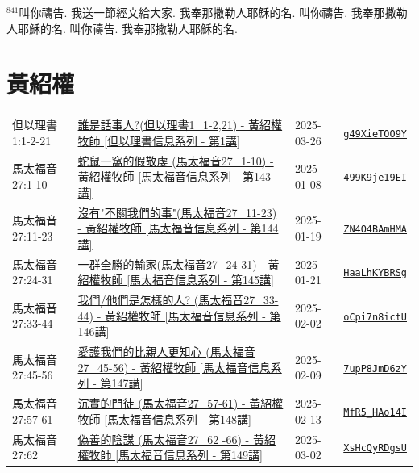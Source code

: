 \documentclass{book}
\begin{document}
$^{841}$叫你禱告.
我送一節經文給大家.
我奉那撒勒人耶穌的名.
叫你禱告.
我奉那撒勒人耶穌的名.
叫你禱告.
我奉那撒勒人耶穌的名.
\newpage



\chapter{黃紹權}\label{ch:preacher16}
\begin{multicols}{3}
\minitoc
\end{multicols}
{ \scriptsize


\begin{xltabular}{\textwidth}{|p{0.15\textwidth} p{0.6\textwidth}|p{0.07\textwidth} p{0.1\textwidth}|}
\hline
但以理書 1:1-2-21 & \hyperref[sec:g49XieTOO9Y]{誰是話事人?(但以理書1\_1-2,21) - 黃紹權牧師  [但以理書信息系列 - 第1講]} & 2025-03-26 & \href{https://youtube.com/watch?v=g49XieTOO9Y}{\texttt{g49XieTOO9Y}} \\
馬太福音 27:1-10 & \hyperref[sec:499K9je19EI]{蛇鼠一窩的假敬虔 (馬太福音27\_1-10) -  黃紹權牧師 [馬太福音信息系列 - 第143講]} & 2025-01-08 & \href{https://youtube.com/watch?v=499K9je19EI}{\texttt{499K9je19EI}} \\
馬太福音 27:11-23 & \hyperref[sec:ZN4O4BAmHMA]{沒有"不關我們的事"(馬太福音27\_11-23) -  黃紹權牧師 [馬太福音信息系列 - 第144講]} & 2025-01-19 & \href{https://youtube.com/watch?v=ZN4O4BAmHMA}{\texttt{ZN4O4BAmHMA}} \\
馬太福音 27:24-31 & \hyperref[sec:HaaLhKYBRSg]{一群全勝的輸家(馬太福音27\_24-31) - 黃紹權牧師  [馬太福音信息系列 - 第145講]} & 2025-01-21 & \href{https://youtube.com/watch?v=HaaLhKYBRSg}{\texttt{HaaLhKYBRSg}} \\
馬太福音 27:33-44 & \hyperref[sec:oCpi7n8ictU]{我們/他們是怎樣的人? (馬太福音27\_33-44) - 黃紹權牧師  [馬太福音信息系列 - 第146講]} & 2025-02-02 & \href{https://youtube.com/watch?v=oCpi7n8ictU}{\texttt{oCpi7n8ictU}} \\
馬太福音 27:45-56 & \hyperref[sec:7upP8JmD6zY]{愛護我們的比親人更知心 (馬太福音27\_45-56) - 黃紹權牧師  [馬太福音信息系列 - 第147講]} & 2025-02-09 & \href{https://youtube.com/watch?v=7upP8JmD6zY}{\texttt{7upP8JmD6zY}} \\
馬太福音 27:57-61 & \hyperref[sec:MfR5_HAo14I]{沉實的門徒  (馬太福音27\_57-61) - 黃紹權牧師  [馬太福音信息系列 - 第148講]} & 2025-02-13 & \href{https://youtube.com/watch?v=MfR5_HAo14I}{\texttt{MfR5\_HAo14I}} \\
馬太福音 27:62 & \hyperref[sec:XsHcQyRDgsU]{偽善的陰謀 (馬太福音27\_62 -66) - 黃紹權牧師  [馬太福音信息系列 - 第149講]} & 2025-03-02 & \href{https://youtube.com/watch?v=XsHcQyRDgsU}{\texttt{XsHcQyRDgsU}} \\

\end{xltabular}}
\end{document}
